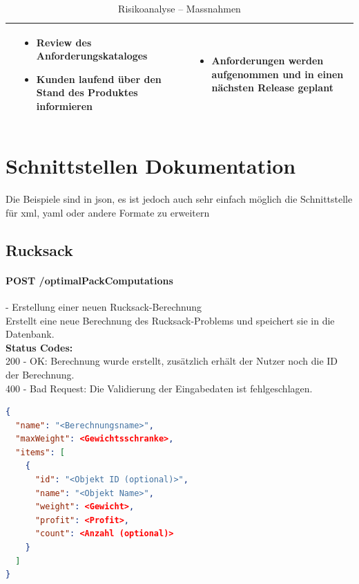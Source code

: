 \begin{table}[ht]
\begin{tabular}{  l | p{4.5cm} | p{4.5cm} }
								&	\begin{itemize}
										\item Review des Anforderungskataloges
										\item Kunden laufend über den Stand des Produktes informieren
									\end{itemize}
								&	\begin{itemize}
										\item Anforderungen werden aufgenommen und in einen nächsten Release geplant							
									\end{itemize}	\\ \hline			
  \end{tabular}
   \caption{Risikoanalyse -- Massnahmen}
\end{table}

\clearpage
\newpage

\section{Schnittstellen Dokumentation}\label{api_doc}

Die Beispiele sind in \gls{json}, es ist jedoch auch sehr einfach möglich die Schnittstelle für \gls{xml}, \gls{yaml} oder andere Formate zu erweitern

%
%
%
%

\subsection{Rucksack}

\paragraph{POST /optimalPackComputations} - Erstellung einer neuen Rucksack-Berechnung\mbox{}\\
Erstellt eine neue Berechnung des Rucksack-Problems und speichert sie in die Datenbank.\\
\textbf{Status Codes:}\\
200 - OK: Berechnung wurde erstellt, zusätzlich erhält der Nutzer noch die ID der Berechnung.\\
400 - Bad Request: Die Validierung der Eingabedaten ist fehlgeschlagen.\\

\begin{lstlisting}[language=JSON, caption=Beispiel einer Eingabe für das Rucksack-Problem, label=lst:input_knapsack]  
{
  "name": "<Berechnungsname>",
  "maxWeight": <Gewichtsschranke>,
  "items": [
    {
      "id": "<Objekt ID (optional)>",
      "name": "<Objekt Name>",
      "weight": <Gewicht>,
      "profit": <Profit>,
      "count": <Anzahl (optional)>
    }
  ]
}
\end{lstlisting}

